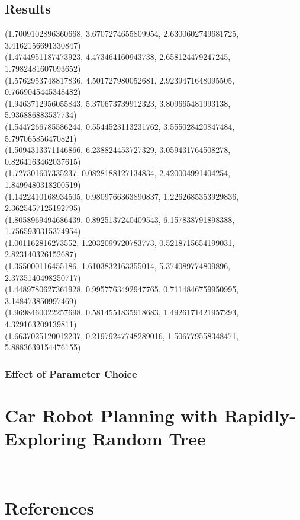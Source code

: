 \documentclass{article}
\begin{document}
\subsection{Results}

(1.7009102896360668, 3.6707274655809954, 2.6300602749681725, 3.4162156691330847)\\
(1.4744951187473923, 4.473464160943738, 2.658124479247245, 1.7982481607093652)\\
(1.5762953748817836, 4.501727980052681, 2.9239471648095505, 0.7669045445348482)\\
(1.9463712956055843, 5.370673739912323, 3.809665481993138, 5.936886883537734)\\
(1.5447266785586244, 0.5544523113231762, 3.555028420847484, 5.797065856470821)\\
(1.5094313371146866, 6.238824453727329, 3.059431764508278, 0.8264163462037615)\\
(1.727301607335237, 0.0828188127134834, 2.420004991404254, 1.8499480318200519)\\
(1.1422410168934505, 0.9809766363890837, 1.2262685353929836, 2.3625457125192795)\\
(1.8058969494686439, 0.8925137240409543, 6.157838791898388, 1.7565930315374954)\\
(1.001162816273552, 1.2032099720783773, 0.5218715654199031, 2.823140326152687)\\
(1.355000116455186, 1.6103832163355014, 5.374089774809896, 2.3735140498250717)\\
(1.4489780627361928, 0.9957763492947765, 0.7114846759950995, 3.148473850997469)\\
(1.9698460022257698, 0.5814551835918683, 1.4926171421957293, 4.329163209139811)\\
(1.6637025120012237, 0.21979247748289016, 1.506779558348471, 5.8883639154476155)

\subsubsection{Effect of Parameter Choice}

\section{Car Robot Planning with Rapidly-Exploring Random Tree}

\

\section{References}
\end{document}
